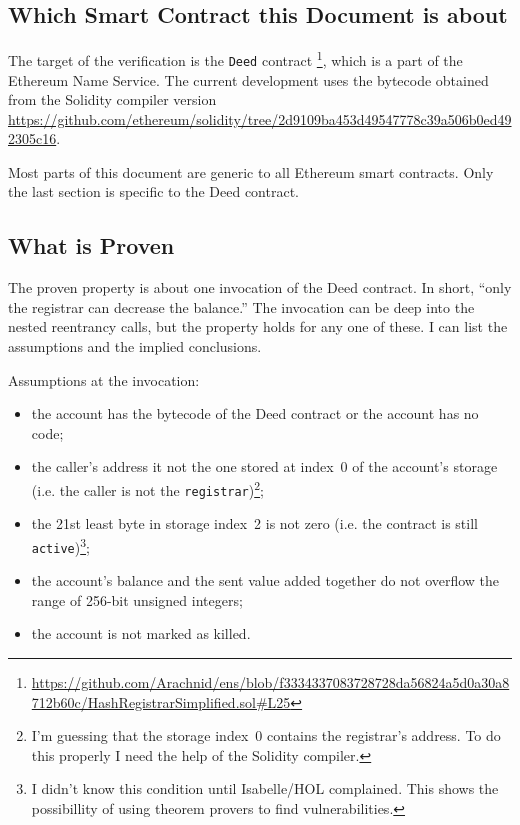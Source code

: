 \documentclass[11pt,a4paper]{article}
\begin{document}
\subsection{Which Smart Contract this Document is about}

The target of the verification is the \texttt{Deed} contract%
\footnote{\url{https://github.com/Arachnid/ens/blob/f3334337083728728da56824a5d0a30a8712b60c/HashRegistrarSimplified.sol\#L25}},
which is a part of the Ethereum Name Service.
The current development uses the bytecode obtained from the
Solidity compiler version \url{https://github.com/ethereum/solidity/tree/2d9109ba453d49547778c39a506b0ed492305c16}.

Most parts of this document are generic to all Ethereum smart
contracts.  Only the last section is specific to the Deed contract.

\subsection{What is Proven}

The proven property is about one invocation of the Deed contract.
In short, ``only the registrar can decrease the balance.''
The invocation can be deep into the nested reentrancy calls, but the property holds for any one of these.
I can list the assumptions and the implied conclusions.

Assumptions at the invocation:
\begin{itemize}
  \item the account has the bytecode of the Deed contract or the
    account has no code;
  \item the caller's address it not the one stored at index~0 of the
    account's storage (i.e. the caller is not the \texttt{registrar})\footnote{I'm guessing that the storage index~0 contains the registrar's address.  To do this properly I need the help of the Solidity compiler.};
  \item the 21st least byte in storage index~2 is not zero (i.e. the contract is still \texttt{active})\footnote{I didn't know this condition until Isabelle/HOL complained.  This shows the possibillity of using theorem provers to find vulnerabilities.};
  \item the account's balance and the sent value added together do not
    overflow the range of 256-bit unsigned integers;
  \item the account is not marked as killed.
\end{itemize}
\end{document}
